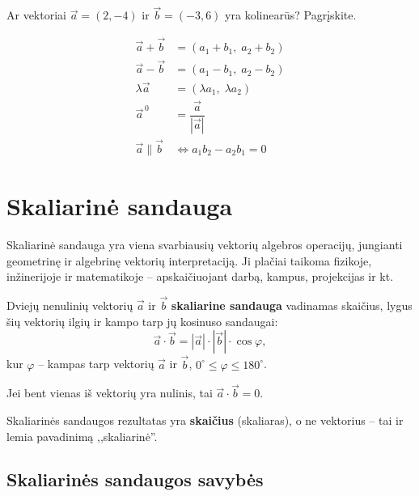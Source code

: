 \begin{exercise}
Ar vektoriai $\vec{a} = (2, -4)$ ir $\vec{b} = (-3, 6)$ yra kolinearūs? Pagrįskite.
\end{exercise}

\begin{tcolorbox}[title={Pagrindinės formulės}, colback=blue!5, colframe=blue!50]
\begin{align*}
  \vec{a} + \vec{b} &= (a_1 + b_1,\; a_2 + b_2) \\[4pt]
  \vec{a} - \vec{b} &= (a_1 - b_1,\; a_2 - b_2) \\[4pt]
  \lambda\vec{a}    &= (\lambda a_1,\; \lambda a_2) \\[4pt]
  \vec{a}^{\,0}     &= \dfrac{\vec{a}}{|\vec{a}|} \\[4pt]
  \vec{a} \parallel \vec{b} &\iff a_1 b_2 - a_2 b_1 = 0
\end{align*}
\end{tcolorbox}


\section{Skaliarinė sandauga}

Skaliarinė sandauga yra viena svarbiausių vektorių algebros operacijų, jungianti geometrinę ir algebrinę vektorių interpretaciją. Ji plačiai taikoma fizikoje, inžinerijoje ir matematikoje – apskaičiuojant darbą, kampus, projekcijas ir kt.

\begin{definition}
Dviejų nenulinių vektorių $\vec{a}$ ir $\vec{b}$ \textbf{skaliarine sandauga} vadinamas skaičius, lygus šių vektorių ilgių ir kampo tarp jų kosinuso sandaugai:
\[
\vec{a} \cdot \vec{b} = |\vec{a}| \cdot |\vec{b}| \cdot \cos\varphi,
\]
kur $\varphi$ -- kampas tarp vektorių $\vec{a}$ ir $\vec{b}$, $0^\circ \leq \varphi \leq 180^\circ$.

Jei bent vienas iš vektorių yra nulinis, tai $\vec{a} \cdot \vec{b} = 0$.
\end{definition}

\begin{remark}
Skaliarinės sandaugos rezultatas yra \textbf{skaičius} (skaliaras), o ne vektorius -- tai ir lemia pavadinimą ,,skaliarinė''.
\end{remark}

\subsection{Skaliarinės sandaugos savybės}

